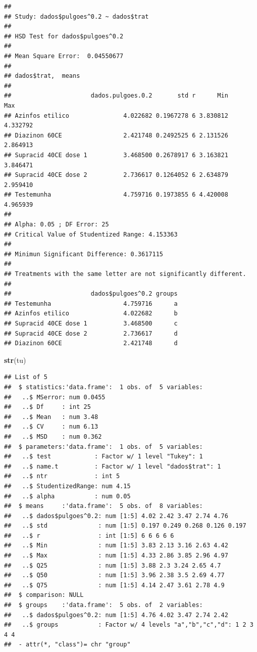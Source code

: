 \documentclass[
]{book}
\newenvironment{Shaded}{\begin{snugshade}}{\end{snugshade}}
\newcommand{\KeywordTok}[1]{\textcolor[rgb]{0.13,0.29,0.53}{\textbf{#1}}}
\newcommand{\NormalTok}[1]{#1}
\begin{document}
\begin{verbatim}
## 
## Study: dados$pulgoes^0.2 ~ dados$trat
## 
## HSD Test for dados$pulgoes^0.2 
## 
## Mean Square Error:  0.04550677 
## 
## dados$trat,  means
## 
##                      dados.pulgoes.0.2       std r      Min      Max
## Azinfos etilico               4.022682 0.1967278 6 3.830812 4.332792
## Diazinon 60CE                 2.421748 0.2492525 6 2.131526 2.864913
## Supracid 40CE dose 1          3.468500 0.2678917 6 3.163821 3.846471
## Supracid 40CE dose 2          2.736617 0.1264052 6 2.634879 2.959410
## Testemunha                    4.759716 0.1973855 6 4.420008 4.965939
## 
## Alpha: 0.05 ; DF Error: 25 
## Critical Value of Studentized Range: 4.153363 
## 
## Minimun Significant Difference: 0.3617115 
## 
## Treatments with the same letter are not significantly different.
## 
##                      dados$pulgoes^0.2 groups
## Testemunha                    4.759716      a
## Azinfos etilico               4.022682      b
## Supracid 40CE dose 1          3.468500      c
## Supracid 40CE dose 2          2.736617      d
## Diazinon 60CE                 2.421748      d
\end{verbatim}

\begin{Shaded}
\begin{Highlighting}[]
\KeywordTok{str}\NormalTok{(tu)}
\end{Highlighting}
\end{Shaded}

\begin{verbatim}
## List of 5
##  $ statistics:'data.frame':  1 obs. of  5 variables:
##   ..$ MSerror: num 0.0455
##   ..$ Df     : int 25
##   ..$ Mean   : num 3.48
##   ..$ CV     : num 6.13
##   ..$ MSD    : num 0.362
##  $ parameters:'data.frame':  1 obs. of  5 variables:
##   ..$ test            : Factor w/ 1 level "Tukey": 1
##   ..$ name.t          : Factor w/ 1 level "dados$trat": 1
##   ..$ ntr             : int 5
##   ..$ StudentizedRange: num 4.15
##   ..$ alpha           : num 0.05
##  $ means     :'data.frame':  5 obs. of  8 variables:
##   ..$ dados$pulgoes^0.2: num [1:5] 4.02 2.42 3.47 2.74 4.76
##   ..$ std              : num [1:5] 0.197 0.249 0.268 0.126 0.197
##   ..$ r                : int [1:5] 6 6 6 6 6
##   ..$ Min              : num [1:5] 3.83 2.13 3.16 2.63 4.42
##   ..$ Max              : num [1:5] 4.33 2.86 3.85 2.96 4.97
##   ..$ Q25              : num [1:5] 3.88 2.3 3.24 2.65 4.7
##   ..$ Q50              : num [1:5] 3.96 2.38 3.5 2.69 4.77
##   ..$ Q75              : num [1:5] 4.14 2.47 3.61 2.78 4.9
##  $ comparison: NULL
##  $ groups    :'data.frame':  5 obs. of  2 variables:
##   ..$ dados$pulgoes^0.2: num [1:5] 4.76 4.02 3.47 2.74 2.42
##   ..$ groups           : Factor w/ 4 levels "a","b","c","d": 1 2 3 4 4
##  - attr(*, "class")= chr "group"
\end{verbatim}
\end{document}
